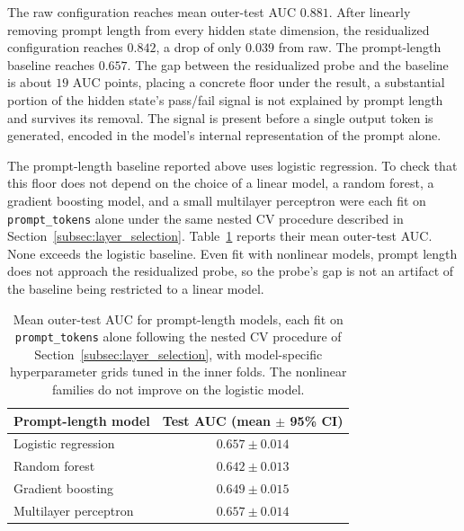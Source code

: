 The raw configuration reaches mean outer-test AUC $0.881$. After linearly removing prompt length from every hidden state dimension, the residualized configuration reaches $0.842$, a drop of only $0.039$ from raw. The prompt-length baseline reaches $0.657$. The gap between the residualized probe and the baseline is about $19$ AUC points, placing a concrete floor under the result, a substantial portion of the hidden state's pass/fail signal is not explained by prompt length and survives its removal. The signal is present before a single output token is generated, encoded in the model's internal representation of the prompt alone.

The prompt-length baseline reported above uses logistic regression. To check that this floor does not depend on the choice of a linear model, a random forest, a gradient boosting model, and a small multilayer perceptron were each fit on \texttt{prompt\_tokens} alone under the same nested CV procedure described in Section~\ref{subsec:layer_selection}. Table~\ref{tab:length_baselines} reports their mean outer-test AUC. None exceeds the logistic baseline. Even fit with nonlinear models, prompt length does not approach the residualized probe, so the probe's gap is not an artifact of the baseline being restricted to a linear model.

\begin{table}[h]
\centering
\begin{tabular}{lc}
\toprule
Prompt-length model & Test AUC (mean $\pm$ 95\% CI) \\
\midrule
Logistic regression   & $0.657 \pm 0.014$ \\
Random forest         & $0.642 \pm 0.013$ \\
Gradient boosting     & $0.649 \pm 0.015$ \\
Multilayer perceptron & $0.657 \pm 0.014$ \\
\bottomrule
\end{tabular}
\caption{Mean outer-test AUC for prompt-length models, each fit on \texttt{prompt\_tokens} alone following the nested CV procedure of Section~\ref{subsec:layer_selection}, with model-specific hyperparameter grids tuned in the inner folds. The nonlinear families do not improve on the logistic model.}
\label{tab:length_baselines}
\end{table}

\FloatBarrier
